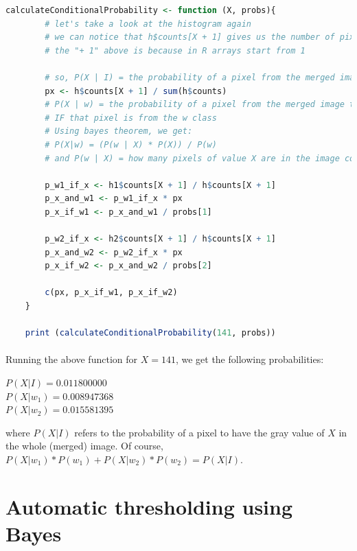 \begin{lstlisting}[language=R, caption=Calculating conditional probabilities]
    calculateConditionalProbability <- function (X, probs){
        # let's take a look at the histogram again
        # we can notice that h$counts[X + 1] gives us the number of pixels that have the gray value of X
        # the "+ 1" above is because in R arrays start from 1

        # so, P(X | I) = the probability of a pixel from the merged image to have the gray value of X
        px <- h$counts[X + 1] / sum(h$counts)
        # P(X | w) = the probability of a pixel from the merged image to have the gray value of X
        # IF that pixel is from the w class
        # Using bayes theorem, we get:
        # P(X|w) = (P(w | X) * P(X)) / P(w)
        # and P(w | X) = how many pixels of value X are in the image corresponding to w / the total number of pixels with a value of X

        p_w1_if_x <- h1$counts[X + 1] / h$counts[X + 1]
        p_x_and_w1 <- p_w1_if_x * px
        p_x_if_w1 <- p_x_and_w1 / probs[1]

        p_w2_if_x <- h2$counts[X + 1] / h$counts[X + 1]
        p_x_and_w2 <- p_w2_if_x * px
        p_x_if_w2 <- p_x_and_w2 / probs[2]

        c(px, p_x_if_w1, p_x_if_w2)
    }

    print (calculateConditionalProbability(141, probs))
\end{lstlisting}

\paragraph{}
Running the above function for $X=141$, we get the following probabilities:
\begin{center}
    $P(X|I) = 0.011800000$
    \\
    $P(X|w_1) = 0.008947368$
    \\
    $P(X|w_2) = 0.015581395$
\end{center}
where $P(X|I)$ refers to the probability of a pixel to have the gray value of $X$ in the whole (merged) image. Of course, $P(X|w_1) * P(w_1) + P(X|w_2) * P(w_2) = P(X|I)$.

\clearpage

\section{Automatic thresholding using Bayes}

